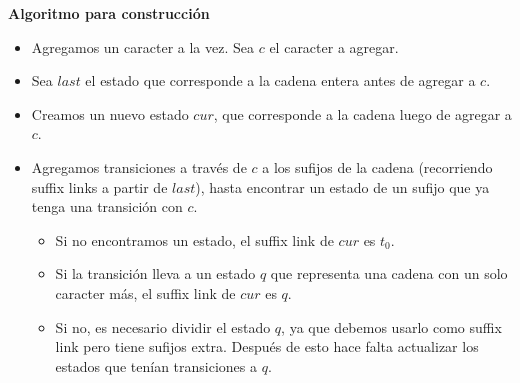 \textbf{Algoritmo para construcción}
\begin{itemize}
	\item Agregamos un caracter a la vez. Sea $c$ el caracter a agregar.
	\item Sea $last$ el estado que corresponde a la cadena entera antes de agregar a $c$.
	\item Creamos un nuevo estado $cur$, que corresponde a la cadena luego de agregar a $c$.
	\item Agregamos transiciones a través de $c$ a los sufijos de la cadena (recorriendo suffix 
	links a partir de $last$), hasta encontrar un estado de un sufijo que ya tenga una transición
	con $c$.
	\begin{itemize}
		\item Si no encontramos un estado, el suffix link de $cur$ es $t_0$.
		\item Si la transición lleva a un estado $q$ que representa una cadena con un solo caracter más,
		el suffix link de $cur$ es $q$.
		\item Si no, es necesario dividir el estado $q$, ya que debemos usarlo como suffix link pero tiene
		sufijos extra. Después de esto hace falta actualizar los estados que tenían transiciones a $q$.
	\end{itemize}
\end{itemize}

